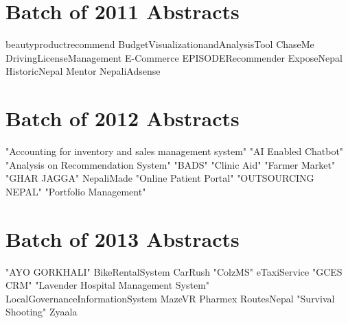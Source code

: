 \documentclass[12pt]{book}
\newcommand{\chapterformatDefault}{
	\titleformat{\chapter}[display]
	{\normalfont\huge\bfseries}{\chaptertitlename\ \thechapter}{20pt}{\Huge}
}
\begin{document}
\chapter[Batch of 2011]{Batch of 2011 Abstracts}
 

%
{beautyproductrecommend}
{BudgetVisualizationandAnalysisTool}
{ChaseMe}
{DrivingLicenseManagement}
{E-Commerce}
{EPISODERecommender}
{ExposeNepal}
{HistoricNepal}
{Mentor}
{NepaliAdsense}


\chapter[Batch of 2012]{Batch of 2012 Abstracts}
{"Accounting for inventory and sales management system"}
{"AI Enabled Chatbot"}
{"Analysis on Recommendation System"}
{"BADS"}
{"Clinic Aid"}
{"Farmer Market"}
{"GHAR JAGGA"}
{NepaliMade}
{"Online Patient Portal"}
{"OUTSOURCING NEPAL"}
{"Portfolio Management"}



\chapter[Batch of 2013]{Batch of 2013 Abstracts}
{"AYO GORKHALI"}
{BikeRentalSystem}
{CarRush}
{"ColzMS"}
{eTaxiService}
{"GCES CRM"}
{"Lavender Hospital Management System"}
{LocalGovernanceInformationSystem}
{MazeVR}
{Pharmex}
{RoutesNepal}
{"Survival Shooting"}
{Zyaala}



\backmatter
\chapterformatDefault
\pagestyle{plain}
\renewcommand{\indexname}{Author Index}
\printindex
\end{document}
